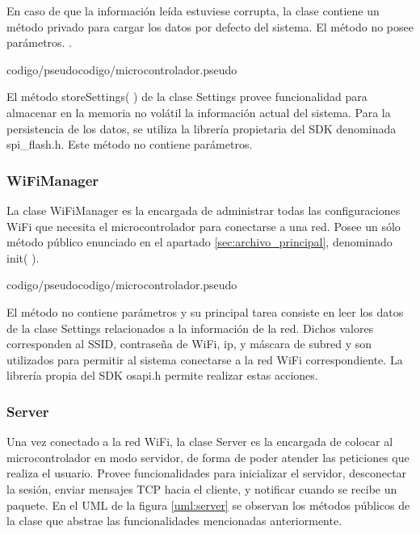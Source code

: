 En caso de que la información leída estuviese corrupta, la clase contiene un método privado para cargar los datos por defecto del sistema.
El método no posee parámetros.
.

{codigo/pseudocodigo/microcontrolador.pseudo}

El método storeSettings( ) de la clase Settings provee funcionalidad para almacenar en la memoria no volátil la información actual del sistema.
Para la persistencia de los datos, se utiliza la librería propietaria del SDK denominada spi\_flash.h.
Este método no contiene parámetros.



\subsubsection{WiFiManager}

La clase WiFiManager es la encargada de administrar todas las configuraciones WiFi que necesita el microcontrolador para conectarse a una red.
Posee un sólo método público enunciado en el apartado \ref{sec:archivo_principal}, denominado init( ).


{codigo/pseudocodigo/microcontrolador.pseudo}

El método no contiene parámetros y su principal tarea consiste en leer los datos de la clase Settings relacionados a la información de la red.
Dichos valores corresponden al SSID, contraseña de WiFi, ip, y máscara de subred y son utilizados para permitir al sistema conectarse a la red WiFi correspondiente.
La librería propia del SDK osapi.h permite realizar estas acciones.



\subsubsection{Server}

Una vez conectado a la red WiFi, la clase Server es la encargada de colocar al microcontrolador en modo servidor, de forma de poder atender las peticiones que realiza el usuario.
Provee funcionalidades para inicializar el servidor, desconectar la sesión, enviar mensajes TCP hacia el cliente, y notificar cuando se recibe un paquete.
En el UML de la figura \ref{uml:server} se observan los métodos públicos de la clase que abstrae las funcionalidades mencionadas anteriormente.

